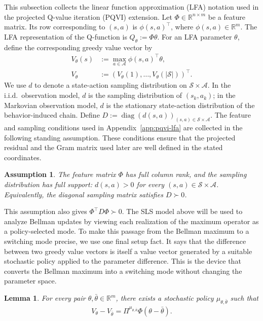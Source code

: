 \documentclass[letterpaper]{article}
\numberwithin{equation}{section}
\newtheorem{assumption}{Assumption}[section]
\newtheorem{lemma}{Lemma}[section]
\newcommand{\R}{\mathbb{R}}
\newcommand{\diag}{\operatorname{diag}}
\begin{document}
This subsection collects the linear function approximation (LFA) notation used in the projected Q-value iteration (PQVI) extension.
Let $\Phi\in\R^{n\times m}$ be a feature matrix. Its
row corresponding to $(s,a)$ is $\phi(s,a)^\top$, where
$\phi(s,a)\in\R^m$. The LFA representation of the Q-function is $Q_\theta:=\Phi\theta$. For an LFA parameter $\theta$, define the corresponding greedy value vector by
\begin{align*}
V_\theta(s)&:=\max_{a\in\mathcal A}\phi(s,a)^\top\theta,\\
V_\theta&:=(V_\theta(1),\ldots,V_\theta(|\mathcal S|))^\top.
\end{align*}
We use $d$ to denote a state-action sampling distribution on
$\mathcal S\times\mathcal A$. In the i.i.d.\ observation model, $d$ is the
sampling distribution of $(s_k,a_k)$; in the Markovian observation model, $d$ is
the stationary state-action distribution of the behavior-induced chain. Define $D:=\diag(d(s,a))_{(s,a)\in\mathcal S\times\mathcal A}$. The feature and sampling conditions used in Appendix~\ref{app:pqvi-lfa} are
collected in the following standing assumption. These conditions ensure that the
projected residual and the Gram matrix used later are well defined in the stated
coordinates.
\begin{assumption}
\label{ass:feature_sampling}
The feature matrix $\Phi$ has full column rank, and the sampling distribution
has full support: $d(s,a)>0$ for every
$(s,a)\in\mathcal S\times\mathcal A$. Equivalently, the diagonal sampling
matrix satisfies $D\succ0$.
\end{assumption}
This assumption also gives $\Phi^\top D\Phi\succ0$.
The SLS model above will be used to analyze Bellman updates by
viewing each realization of the maximum operator as a policy-selected mode. To
make this passage from the Bellman maximum to a switching mode precise, we use
one final setup fact. It says that the difference between two greedy value
vectors is itself a value vector generated by a suitable stochastic policy
applied to the parameter difference. This is the device that converts the
Bellman maximum into a switching mode without changing the parameter space.
\begin{lemma}
\label{lem:stochastic_policy_linearization}
For every pair $\theta,\bar\theta\in\R^m$, there exists a stochastic policy
$\mu_{\theta,\bar\theta}$ such that
\begin{align*}
V_\theta-V_{\bar\theta}
=
\Pi^{\mu_{\theta,\bar\theta}}\Phi(\theta-\bar\theta).
\end{align*}
\end{lemma}
\end{document}
